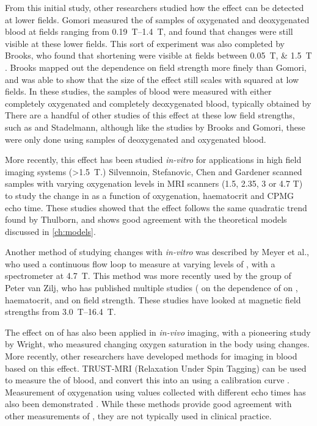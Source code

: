 From this initial study, other researchers studied how the effect can be detected at lower fields.
Gomori measured the \Ttwo of samples of oxygenated and deoxygenated blood at fields ranging from \SIrange{0.19}{1.4}{T}, and found that changes were still visible at these lower fields\cite{GomoriNMRRelaxationTimes1987}.
This sort of experiment was also completed by Brooks, who found that \Ttwo shortening were visible at fields between \SIlist{0.05;1.5}{T} \cite{BrooksComparisont2relaxation1995}.
Brooks mapped out the dependence on field strength more finely than Gomori, and was able to show that the size of the effect still scales with \Bzero squared at low fields.
In these studies, the samples of blood were measured with either completely oxygenated and completely deoxygenated blood, typically obtained by
There are a handful of other studies of this effect at these low field strengths, such as \cite{BryantMagneticrelaxationblood1990} and Stadelmann\cite{StadelmannRelaxationtimesvenous1991},
although like the studies by Brooks and Gomori, these were only done using samples of deoxygenated and oxygenated blood.

More recently, this effect has been studied \textit{in-vitro} for applications in high field imaging systems (\SI{>1.5}{T}.)
Silvennoin\cite{JohannaSilvennoinenBloodNMRrelaxation2002}, Stefanovic\cite{StefanovicHumanwholebloodrelaxometry2004}, Chen\cite{ChenHumanwholeblood2009} and Gardener\cite{GardenerDependencebloodR22010} scanned samples with varying oxygenation levels in MRI scanners (1.5, 2.35, 3 or 4.7 T) to study the change in \Ttwo as a function of oxygenation, haematocrit and CPMG echo time.
These studies showed that the effect follows the same quadratic trend found by Thulborn, and shows good agreement with the theoretical models discussed in \autoref{ch:models}.

Another method of studying \Ttwo changes with \SOtwo \textit{in-vitro} was described by Meyer et al., who used a continuous flow loop to measure \Ttwo at varying levels of \SOtwo, with a spectrometer at \SI{4.7}{T}.
This method was more recently used by the group of Peter van Zilj, who has published multiple studies (\cite{ZhaoOxygenationhematocritdependence2007,GrgacTransversewaterrelaxation2017,QinDeterminationwholebrainoxygen2011} on the dependence of \Ttwo on \SOtwo, haematocrit, and on field strength.
These studies have looked at magnetic field strengths from \SIrange{3.0}{16.4}{T}.

The effect on \Ttwo of \SOtwo has also been applied in \textit{in-vivo} imaging, with a pioneering study by Wright\cite{WrightEstimatingoxygensaturation1991}, who measured changing oxygen saturation in the body using \Ttwo changes.
More recently, other researchers have developed methods for imaging \SOtwo in blood based on this \Ttwo effect.
TRUST-MRI (\Ttwo Relaxation Under Spin Tagging) can be used to measure the \Ttwo of blood, and convert this into an \SOtwo using a calibration curve \cite{LuQuantitativeevaluationoxygenation2008}.
Measurement of oxygenation using \Ttwo values collected with different echo times has also been demonstrated \cite{VargheseCMRbasedbloodoximetry2017}.
While these methods provide good agreement with other measurements of \SOtwo, they are not typically used in clinical practice.

